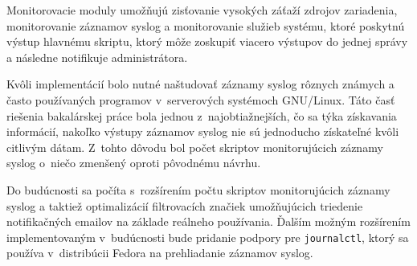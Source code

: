 Monitorovacie moduly umožňujú zisťovanie vysokých záťaží zdrojov zariadenia, monitorovanie záznamov syslog a monitorovanie služieb systému, ktoré poskytnú výstup hlavnému skriptu, ktorý môže zoskupiť viacero výstupov do jednej správy a následne notifikuje administrátora.

Kvôli implementácií bolo nutné naštudovať záznamy syslog rôznych známych a často používaných programov v~serverových systémoch GNU/Linux. Táto časť riešenia bakalárskej práce bola jednou z~najobtiažnejších, čo sa týka získavania informácií, nakoľko výstupy záznamov syslog nie sú jednoducho získateľné kvôli citlivým dátam. Z~tohto dôvodu bol počet skriptov monitorujúcich záznamy syslog o~niečo zmenšený oproti pôvodnému návrhu.

Do budúcnosti sa počíta s~rozšírením počtu skriptov monitorujúcich záznamy syslog a taktiež optimalizácií filtrovacích značiek umožňujúcich triedenie notifikačných emailov na základe reálneho používania. Ďalším možným rozšírením implementovaným v~budúcnosti bude pridanie podpory pre \texttt{journalctl}, ktorý sa používa v~distribúcii Fedora na prehliadanie záznamov syslog.





\nocite{*}

